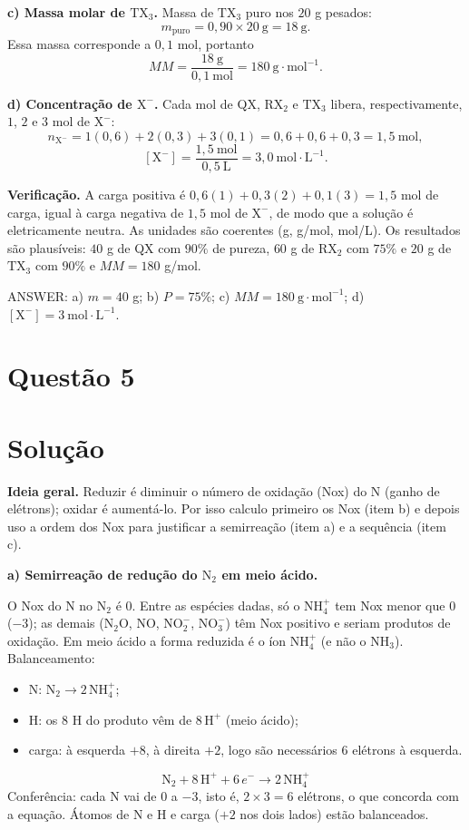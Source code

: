 \documentclass{article}%
\begin{document}
\textbf{c) Massa molar de $\mathrm{TX_3}$.} Massa de $\mathrm{TX_3}$ puro nos $20$ g pesados:
\[
m_{\text{puro}}=0{,}90\times 20\ \mathrm{g}=18\ \mathrm{g}.
\]
Essa massa corresponde a $0{,}1$ mol, portanto
\[
MM=\frac{18\ \mathrm{g}}{0{,}1\ \mathrm{mol}}=180\ \mathrm{g\cdot mol^{-1}}.
\]

\textbf{d) Concentração de $\mathrm{X^-}$.} Cada mol de QX, $\mathrm{RX_2}$ e $\mathrm{TX_3}$ libera, respectivamente, $1$, $2$ e $3$ mol de $\mathrm{X^-}$:
\[
n_{\mathrm{X^-}} = 1(0{,}6)+2(0{,}3)+3(0{,}1)=0{,}6+0{,}6+0{,}3=1{,}5\ \mathrm{mol},
\]
\[
[\mathrm{X^-}]=\frac{1{,}5\ \mathrm{mol}}{0{,}5\ \mathrm{L}}=3{,}0\ \mathrm{mol\cdot L^{-1}}.
\]

\textbf{Verificação.} A carga positiva é $0{,}6(1)+0{,}3(2)+0{,}1(3)=1{,}5$ mol de carga, igual à carga negativa de $1{,}5$ mol de $\mathrm{X^-}$, de modo que a solução é eletricamente neutra. As unidades são coerentes (g, g/mol, mol/L). Os resultados são plausíveis: $40$ g de QX com $90\%$ de pureza, $60$ g de $\mathrm{RX_2}$ com $75\%$ e $20$ g de $\mathrm{TX_3}$ com $90\%$ e $MM=180$ g/mol.

\medskip
ANSWER: a) $m=40$ g; b) $P=75\%$; c) $MM=180\ \mathrm{g\cdot mol^{-1}}$; d) $[\mathrm{X^-}]=3\ \mathrm{mol\cdot L^{-1}}$.%
\newpage%
\section*{Questão 5}

\section*{Solução}

\textbf{Ideia geral.} Reduzir é diminuir o número de oxidação (Nox) do N (ganho de elétrons); oxidar é aumentá-lo. Por isso calculo primeiro os Nox (item b) e depois uso a ordem dos Nox para justificar a semirreação (item a) e a sequência (item c).

\medskip
\textbf{a) Semirreação de redução do $\mathrm{N_2}$ em meio ácido.}

O Nox do N no $\mathrm{N_2}$ é $0$. Entre as espécies dadas, só o $\mathrm{NH_4^+}$ tem Nox menor que $0$ ($-3$); as demais ($\mathrm{N_2O}$, $\mathrm{NO}$, $\mathrm{NO_2^-}$, $\mathrm{NO_3^-}$) têm Nox positivo e seriam produtos de oxidação. Em meio ácido a forma reduzida é o íon $\mathrm{NH_4^+}$ (e não o $\mathrm{NH_3}$). Balanceamento:
\begin{itemize}
\item N: $\mathrm{N_2} \to 2\,\mathrm{NH_4^+}$;
\item H: os $8$ H do produto vêm de $8\,\mathrm{H^+}$ (meio ácido);
\item carga: à esquerda $+8$, à direita $+2$, logo são necessários $6$ elétrons à esquerda.
\end{itemize}
\[
\boxed{\mathrm{N_2} + 8\,\mathrm{H^+} + 6\,e^- \longrightarrow 2\,\mathrm{NH_4^+}}
\]
Conferência: cada N vai de $0$ a $-3$, isto é, $2\times 3 = 6$ elétrons, o que concorda com a equação. Átomos de N e H e carga ($+2$ nos dois lados) estão balanceados.
\end{document}
